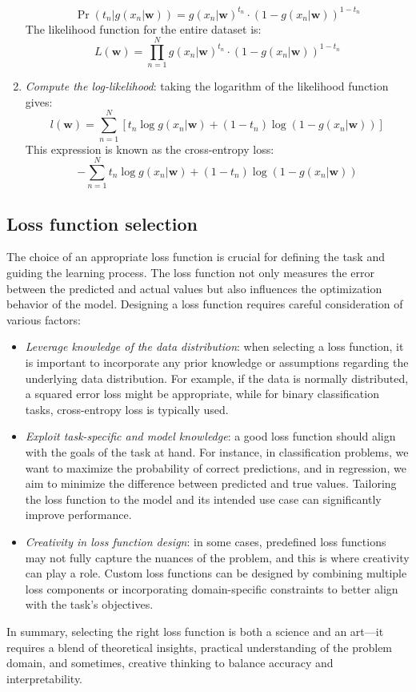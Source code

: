 \begin{example}
\begin{enumerate}
            \[\Pr(t_n|g(x_n|\mathbf{w})) = g(x_n|\mathbf{w})^{t_n} \cdot (1 - g(x_n|\mathbf{w}))^{1 - t_n}\]
            The likelihood function for the entire dataset is:
            \[L(\mathbf{w}) = \prod_{n=1}^N g(x_n|\mathbf{w})^{t_n} \cdot (1 - g(x_n|\mathbf{w}))^{1 - t_n}\]
        \item \textit{Compute the log-likelihood}: taking the logarithm of the likelihood function gives:
            \[l(\mathbf{w}) = \sum_{n=1}^N \left[ t_n \log g(x_n|\mathbf{w}) + (1 - t_n) \log(1 - g(x_n|\mathbf{w})) \right]\]
            This expression is known as the cross-entropy loss:
            \[- \sum_{n=1}^N t_n \log g(x_n|\mathbf{w}) + (1 - t_n) \log(1 - g(x_n|\mathbf{w}))\]
    \end{enumerate}
\end{example}

\subsection{Loss function selection}
The choice of an appropriate loss function is crucial for defining the task and guiding the learning process. 
The loss function not only measures the error between the predicted and actual values but also influences the optimization behavior of the model. 
Designing a loss function requires careful consideration of various factors:
\begin{itemize}
    \item \textit{Leverage knowledge of the data distribution}: when selecting a loss function, it is important to incorporate any prior knowledge or assumptions regarding the underlying data distribution. 
        For example, if the data is normally distributed, a squared error loss might be appropriate, while for binary classification tasks, cross-entropy loss is typically used.
    \item \textit{Exploit task-specific and model knowledge}: a good loss function should align with the goals of the task at hand.
        For instance, in classification problems, we want to maximize the probability of correct predictions, and in regression, we aim to minimize the difference between predicted and true values. 
        Tailoring the loss function to the model and its intended use case can significantly improve performance.
    \item \textit{Creativity in loss function design}: in some cases, predefined loss functions may not fully capture the nuances of the problem, and this is where creativity can play a role. 
        Custom loss functions can be designed by combining multiple loss components or incorporating domain-specific constraints to better align with the task's objectives.
\end{itemize}
In summary, selecting the right loss function is both a science and an art—it requires a blend of theoretical insights, practical understanding of the problem domain, and sometimes, creative thinking to balance accuracy and interpretability.


